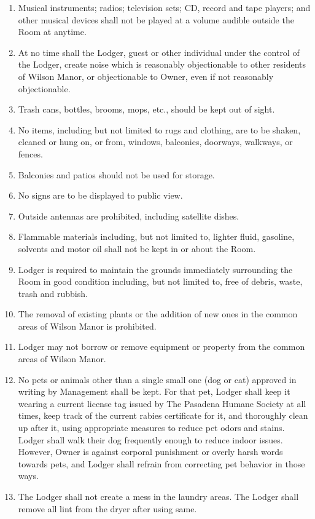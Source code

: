 \documentclass[12pt,letterpaper]{article}
\newcommand{\lodger}{Lodger}
\newcommand{\management}{Management}
\newcommand{\condo}{Wilson Manor}
\newcommand{\room}{Room}
\begin{document}
\begin{enumerate}
	\item Musical instruments; radios; television sets; CD, record and tape players; and other musical devices shall not be played at a volume audible outside the \room{} at anytime. 
	\item At no time shall the \lodger{}, guest or other individual under the control of the \lodger{}, create noise which is reasonably objectionable to other residents of \condo{}, or objectionable to Owner, even if not reasonably objectionable. 
	\item Trash cans, bottles, brooms, mops, etc., should be kept out of sight.
	\item No items, including but not limited to rugs and clothing, are to be shaken, cleaned or hung on, or from, windows, balconies, doorways, walkways, or fences. 
	\item Balconies and patios should not be used for storage.
	\item No signs are to be displayed to public view.
	\item Outside antennas are prohibited, including satellite dishes.
	\item Flammable materials including, but not limited to, lighter fluid, gasoline, solvents and motor oil shall not be kept in or about the \room{}. 
	\item \lodger{} is required to maintain the grounds immediately surrounding the \room{} in good condition including, but not limited to, free of debris, waste, trash and rubbish. 
	\item The removal of existing plants or the addition of new ones in the common areas of \condo{} is prohibited.
	\item \lodger{} may not borrow or remove equipment or property from the common areas of \condo{}. 
	\item No pets or animals other than a single small one (dog or cat) approved in writing by \management{} shall be kept. For that pet, \lodger{} shall keep it wearing a current license tag issued by The Pasadena Humane Society at all times, keep track of the current rabies certificate for it, and thoroughly clean up after it, using appropriate measures to reduce pet odors and stains. \lodger{} shall walk their dog frequently enough to reduce indoor issues. However, Owner is against corporal punishment or overly harsh words towards pets, and \lodger{} shall refrain from correcting pet behavior in those ways.
	\item The \lodger{} shall not create a mess in the laundry areas. The \lodger{} shall remove all lint from the dryer after using same. 

\end{enumerate}
\end{document}
